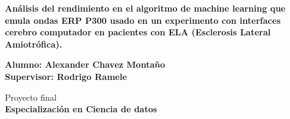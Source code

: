 
\begin{titlepage}
	
	
	\thispagestyle{frontpage}
	
	\begin{center}
		
		\vspace*{6\baselineskip}
	
		
	{\Large\textbf{Análisis del rendimiento en el algoritmo de machine learning que emula ondas ERP P300 usado en un experimento con interfaces cerebro computador en pacientes con ELA (Esclerosis Lateral Amiotrófica).\\}}   
		
		
        \vspace*{1,5\baselineskip}

		\large{\textbf{Alumno: Alexander Chavez Montaño}}\\
		\large{\textbf{Supervisor: Rodrigo Ramele}}\\
		
		\vspace{1,5\baselineskip}
		
		\large{Proyecto final}\\
		\large{\textbf{Especialización en Ciencia de datos}}\\
		
		\vspace{1,5\baselineskip}

	\end{center}
	
	\vspace*{6\baselineskip}
	
	
\end{titlepage}
